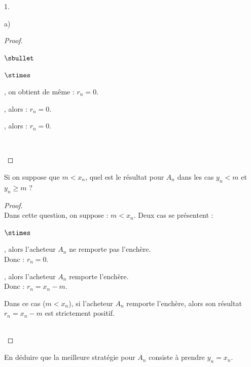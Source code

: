 \documentclass[11pt]{article}%
\begin{document}
\begin{noliste}{1.}
\begin{noliste}{a)}
\begin{proof}
\begin{noliste}{$\sbullet$}
\begin{noliste}{$\stimes$}
	  \item {}, on obtient de même : $r_n=0$.
	  
	  \item {}, alors : $r_n=0$.
	  
	  \item {}, alors : $r_n=0$.
	\end{noliste}
	~\\[-1.4cm]
      \end{noliste}
    \end{proof}

    
    \item Si on suppose que $m < x_n$, quel est le résultat pour $A_n$
    dans les cas $y_n < m$ et $y_n \geq m$ ?
    
    \begin{proof}~\\
      Dans cette question, on suppose : $m < x_n$. Deux cas se 
      présentent :
      \begin{noliste}{$\stimes$}
	\item {}, alors l'acheteur $A_n$ ne 
	remporte pas l'enchère. \\
	Donc : $r_n=0$.
	
	\item {}, alors l'acheteur $A_n$
	remporte l'enchère.\\
	Donc : $r_n= x_n-m$.
      \end{noliste}
      
      \begin{remarkL}{.95}
        Dans ce cas ($m<x_n$), si l'acheteur $A_n$ remporte l'enchère,
        alors son résultat $r_n=x_n-m$ est strictement positif.
      \end{remarkL}~\\[-1.4cm]
    \end{proof}

    
    \newpage
    
    
    \item En déduire que la meilleure stratégie pour $A_n$ consiste 
    à prendre $y_n =x_n$.
    

\end{noliste}
\end{noliste}
\end{document}
